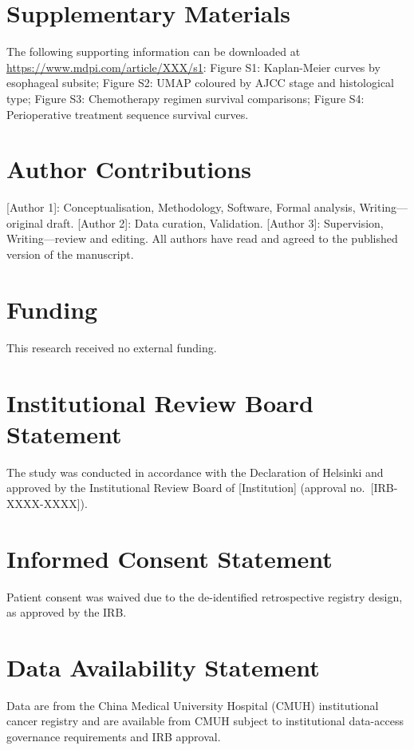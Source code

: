 \documentclass[12pt,a4paper]{article}
\begin{document}
\section*{Supplementary Materials}
The following supporting information can be downloaded at
\url{https://www.mdpi.com/article/XXX/s1}: Figure S1: Kaplan-Meier
curves by esophageal subsite; Figure S2: UMAP coloured by AJCC stage
and histological type; Figure S3: Chemotherapy regimen survival
comparisons; Figure S4: Perioperative treatment sequence survival curves.

\section*{Author Contributions}
[Author 1]: Conceptualisation, Methodology, Software, Formal analysis,
Writing---original draft.
[Author 2]: Data curation, Validation.
[Author 3]: Supervision, Writing---review and editing.
All authors have read and agreed to the published version of the
manuscript.

\section*{Funding}
This research received no external funding.

\section*{Institutional Review Board Statement}
The study was conducted in accordance with the Declaration of Helsinki
and approved by the Institutional Review Board of [Institution]
(approval no.\ [IRB-XXXX-XXXX]).

\section*{Informed Consent Statement}
Patient consent was waived due to the de-identified retrospective registry
design, as approved by the IRB.

\section*{Data Availability Statement}
Data are from the China Medical University Hospital (CMUH) institutional
cancer registry and are available from CMUH subject to institutional
data-access governance requirements and IRB approval.
\end{document}
